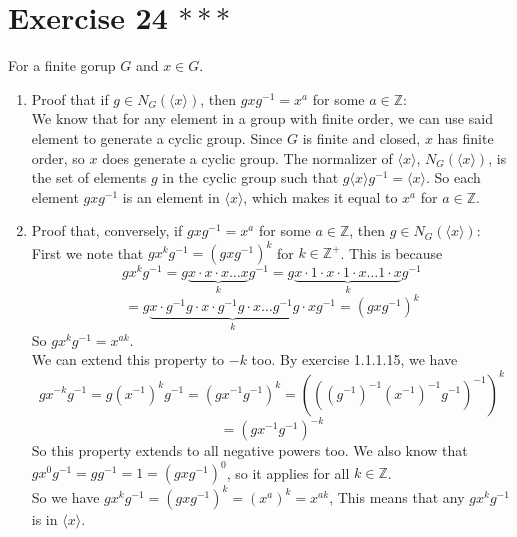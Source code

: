 \documentclass[12pt]{article}
\newcommand{\Z}{\mathbb{Z}}
\begin{document}
    \section*{Exercise 24 $***$}
    For a finite gorup $G$ and $x \in G$. \\
    \begin{enumerate}[label=\textbf{\alph*.}]
        \item 
            Proof that if $g \in N_G(\langle x \rangle)$,
            then $gxg^{-1} = x^a$ for some $a \in \Z$: \\
            We know that for any element in a group with finite order,
            we can use said element to generate a cyclic group.
            Since $G$ is finite and closed,
            $x$ has finite order,
            so $x$ does generate a cyclic group.
            The normalizer of $\langle x \rangle$,
            $N_G(\langle x \rangle)$,
            is the set of elements $g$ in the cyclic group
            such that $g\langle x \rangle g^{-1} = \langle x \rangle$.
            So each element $gxg^{-1}$
            is an element in $\langle x \rangle$,
            which makes it equal to $x^a$ for $a \in \Z$.
        \item
            Proof that, conversely, if $gxg^{-1} = x^a$
            for some $a \in \Z$,
            then $g \in N_G(\langle x \rangle)$: \\
            First we note that $gx^kg^{-1} = (gxg^{-1})^k$
            for $k \in \Z^+$.
            This is because
            \[ gx^kg^{-1}
            = g\underbrace{x \cdot x \cdot x \dots x}_{k}g^{-1} 
            = g\underbrace{x \cdot 1 \cdot x \cdot 1 \cdot x 
            \dots 1 \cdot x}_{k}g^{-1}  \]
            \[ = g\underbrace{x \cdot g^{-1}g \cdot x \cdot g^{-1}g \cdot x 
            \dots g^{-1}g \cdot x}_{k}g^{-1} 
            = (gxg^{-1})^k \]
            So $gx^kg^{-1} = x^{ak}$. \\
            We can extend this property to $-k$ too.
            By exercise 1.1.1.15, we have
            \[ gx^{-k}g^{-1} = g(x^{-1})^kg^{-1}
            =  (gx^{-1}g^{-1})^k
            = (((g^{-1})^{-1}(x^{-1})^{-1}g^{-1})^{-1})^k \]
            \[ = (gx^{-1}g^{-1})^{-k} \]
            So this property extends to all negative powers too.
            We also know that $gx^0g^{-1} = gg^{-1} = 1 = (gxg^{-1})^0$,
            so it applies for all $k \in \Z$. \\
            So we have $gx^kg^{-1} = (gxg^{-1})^k = (x^a)^k = x^{ak}$,
            This means that any $gx^kg^{-1}$ is in $\langle x \rangle$.

\end{enumerate}
\end{document}
